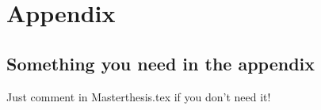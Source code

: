 \chapter{Appendix}
\label{appendixB}
\section{Something you need in the appendix}
Just comment \verb|| in Masterthesis.tex if you don't need it!
